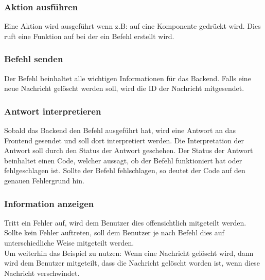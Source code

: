 \subsubsection{Aktion ausführen}
Eine Aktion wird ausgeführt wenn z.B: auf eine Komponente gedrückt wird. Dies ruft eine Funktion auf bei der ein Befehl erstellt wird.

\subsubsection{Befehl senden}
Der Befehl beinhaltet alle wichtigen Informationen für das Backend. Falls eine neue Nachricht gelöscht werden soll, wird die ID der Nachricht mitgesendet.

\subsubsection{Antwort interpretieren}
Sobald das Backend den Befehl ausgeführt hat, wird eine Antwort an das Frontend gesendet und soll dort interpretiert werden. Die Interpretation der Antwort soll durch den Status der Antwort geschehen. Der Status der Antwort beinhaltet einen Code, welcher aussagt, ob der Befehl funktioniert hat oder fehlgeschlagen ist. Sollte der Befehl fehlschlagen, so deutet der Code auf den genauen Fehlergrund hin.

\subsubsection{Information anzeigen}
Tritt ein Fehler auf, wird dem Benutzer dies offensichtlich mitgeteilt werden.\\
Sollte kein Fehler auftreten, soll dem Benutzer je nach Befehl dies auf unterschiedliche Weise mitgeteilt werden.\\
Um weiterhin das Beispiel zu nutzen: Wenn eine Nachricht gelöscht wird, dann wird dem Benutzer mitgeteilt, dass die Nachricht gelöscht worden ist, wenn diese Nachricht verschwindet.